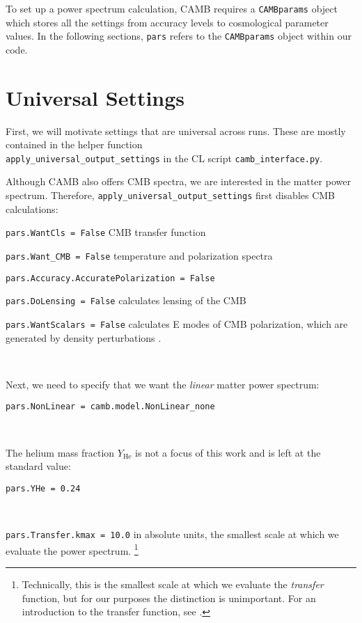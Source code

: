 
To set up a power spectrum calculation, CAMB requires a
\verb|CAMBparams| object which stores all the settings from accuracy levels
to cosmological parameter values. In the following sections, \verb|pars| 
refers to the \verb|CAMBparams| object within our code.

\section{Universal Settings}

First, we will motivate settings that are universal across runs. These are 
mostly contained in the helper function \\
\verb|apply_universal_output_settings| in the
CL script \verb|camb_interface.py|.

Although CAMB also offers CMB spectra, we are interested in the
matter power spectrum. Therefore, \verb|apply_universal_output_settings|  
first disables CMB calculations:

\verb|pars.WantCls = False| \quad CMB transfer function

\verb|pars.Want_CMB = False| \quad temperature and polarization spectra

\verb|pars.Accuracy.AccuratePolarization = False|

\verb|pars.DoLensing = False| \quad calculates lensing of the CMB

\verb|pars.WantScalars = False| \quad calculates E modes of CMB polarization, 
which are generated by density perturbations .

\

Next, we need to specify that we want the \textit{linear} matter power 
spectrum:

\verb|pars.NonLinear = camb.model.NonLinear_none|


\

The helium mass fraction $Y_\text{He}$ is not a focus of this work and is left
at the standard value:

\verb|pars.YHe = 0.24| \quad {}

\


\verb|pars.Transfer.kmax = 10.0| \quad in absolute units,
the smallest scale at which we evaluate the power spectrum.
\footnote{Technically, this is the smallest scale at which we evaluate the
\textit{transfer} function, but for our purposes the distinction is
unimportant. For an introduction to the transfer function, see \citet{FECS}.} 

